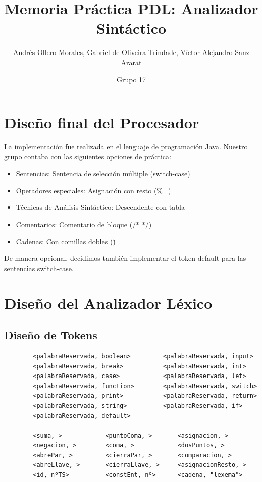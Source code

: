\documentclass{article}[a4paper]
\title{Memoria Práctica PDL: Analizador Sintáctico}
\author{Andrés Ollero Morales, Gabriel de Oliveira Trindade, Víctor Alejandro Sanz Ararat}
\date{Grupo 17}
\begin{document}

\thispagestyle{empty}
\newpage
\tableofcontents
\thispagestyle{empty}

\newpage

\section{Diseño final del Procesador}
La implementación fue realizada en el lenguaje de programación Java. Nuestro grupo contaba con las siguientes opciones de práctica:
\begin{itemize}
    \item Sentencias: Sentencia de selección múltiple (switch-case)
    \item Operadores especiales: Asignación con resto (\%=)
    \item Técnicas de Análisis Sintáctico: Descendente con tabla
    \item Comentarios: Comentario de bloque (/* */)
    \item Cadenas: Con comillas dobles (\" \")
\end{itemize}
De manera opcional, decidimos también implementar el token default para las sentencias switch-case.

\section{Diseño del Analizador Léxico}

\subsection{Diseño de Tokens}
\begin{verbatim}
        <palabraReservada, boolean>         <palabraReservada, input>
        <palabraReservada, break>           <palabraReservada, int>
        <palabraReservada, case>            <palabraReservada, let>
        <palabraReservada, function>        <palabraReservada, switch>
        <palabraReservada, print>           <palabraReservada, return>
        <palabraReservada, string>          <palabraReservada, if>
        <palabraReservada, default>
        
        <suma, >            <puntoComa, >       <asignacion, >
        <negacion, >        <coma, >            <dosPuntos, >
        <abrePar, >         <cierraPar, >       <comparacion, >
        <abreLlave, >       <cierraLlave, >     <asignacionResto, >
        <id, nºTS>          <constEnt, nº>      <cadena, "lexema">
\end{verbatim}
\end{document}

